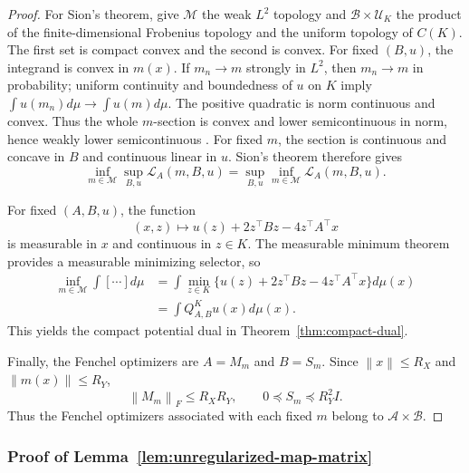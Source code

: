 \documentclass[11pt]{article}
\newcommand{\cU}{\mathcal U}
\newcommand{\cM}{\mathcal M}
\newcommand{\norm}[1]{\left\lVert #1\right\rVert}
\theoremstyle{plain}
\theoremstyle{definition}
\theoremstyle{remark}
\begin{document}
\begin{proof}
For Sion's theorem, give $\cM$ the weak $L^2$ topology and
$\mathcal B\times\cU_K$ the product of the finite-dimensional Frobenius topology
and the uniform topology of $C(K)$.  The first set is compact convex and the second
is convex.  For fixed $(B,u)$, the integrand is convex in $m(x)$.  If
$m_n\to m$ strongly in $L^2$, then $m_n\to m$ in probability; uniform continuity
and boundedness of $u$ on $K$ imply
$\int u(m_n)d\mu\to\int u(m)d\mu$.  The positive quadratic is norm continuous
and convex. Thus the whole $m$-section is convex and lower semicontinuous in norm,
hence weakly lower semicontinuous \cite[Corollary~3.9]{BrezisFA}. For fixed $m$,
the section is continuous and concave in $B$ and continuous linear in $u$. Sion's
theorem \cite{Sion}
therefore gives
\[
 \inf_{m\in\cM}\sup_{B,u}\mathcal L_A(m,B,u)
 =\sup_{B,u}\inf_{m\in\cM}\mathcal L_A(m,B,u).
\]

For fixed $(A,B,u)$, the function
\[
 (x,z)\mapsto u(z)+2z^\top Bz-4z^\top A^\top x
\]
is measurable in $x$ and continuous in $z\in K$.  The measurable minimum theorem
\cite[Theorem~18.19]{AliprantisBorder} provides a measurable minimizing selector,
so
\begin{align*}
 \inf_{m\in\cM}\int[\cdots]d\mu
 &=\int\min_{z\in K}
 \{u(z)+2z^\top Bz-4z^\top A^\top x\}d\mu(x)\\
 &=\int Q_{A,B}^Ku(x)d\mu(x).
\end{align*}
This yields the compact potential dual in Theorem~\ref{thm:compact-dual}.

Finally, the Fenchel optimizers are $A=M_m$ and $B=S_m$.  Since
$\norm x\le R_X$ and $\norm{m(x)}\le R_Y$,
\[
 \norm{M_m}_F\le R_XR_Y,\qquad
 0\preceq S_m\preceq R_Y^2I.
\]
Thus the Fenchel optimizers associated with each fixed $m$ belong to
$\mathcal A\times\mathcal B$.
\end{proof}

\subsubsection{Proof of Lemma~\ref{lem:unregularized-map-matrix}}
\label{proof:8.1}
\end{document}
